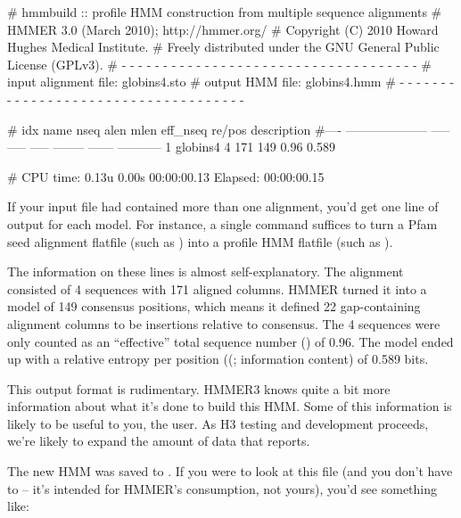 \begin{sreoutput}
# hmmbuild :: profile HMM construction from multiple sequence alignments
# HMMER 3.0 (March 2010); http://hmmer.org/
# Copyright (C) 2010 Howard Hughes Medical Institute.
# Freely distributed under the GNU General Public License (GPLv3).
# - - - - - - - - - - - - - - - - - - - - - - - - - - - - - - - - - - - -
# input alignment file:             globins4.sto
# output HMM file:                  globins4.hmm
# - - - - - - - - - - - - - - - - - - - - - - - - - - - - - - - - - - - -

# idx name                  nseq  alen  mlen eff_nseq re/pos description
#---- -------------------- ----- ----- ----- -------- ------ -----------
1     globins4                 4   171   149     0.96  0.589 

# CPU time: 0.13u 0.00s 00:00:00.13 Elapsed: 00:00:00.15
\end{sreoutput}

If your input file had contained more than one alignment, you'd get
one line of output for each model. For instance, a single
 command suffices to turn a Pfam seed alignment
flatfile (such as ) into a profile HMM flatfile
(such as ).

The information on these lines is almost self-explanatory. The
 alignment consisted of 4 sequences with 171 aligned
columns. HMMER turned it into a model of 149 consensus positions,
which means it defined 22 gap-containing alignment columns to be
insertions relative to consensus. The 4 sequences were only counted as
an ``effective'' total sequence number () of 0.96. The
model ended up with a relative entropy per position ((;
information content) of 0.589 bits.

This output format is rudimentary.  HMMER3 knows quite a bit more
information about what it's done to build this HMM. Some of this
information is likely to be useful to you, the user. As H3 testing and
development proceeds, we're likely to expand the amount of data that
 reports.

The new HMM was saved to . If you were to look at
this file (and you don't have to -- it's intended for HMMER's
consumption, not yours), you'd see something like:

